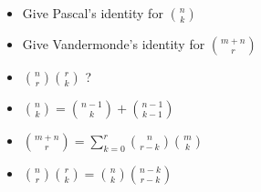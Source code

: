 \documentclass[12pt]{article}
\newcommand*{\xfield}[1]{\begin{mdframed}\centering #1\end{mdframed}\bigskip}
\newenvironment{note}{}{}
\begin{document}
\begin{note}
	\xfield{\begin{itemize}
	\item Give Pascal's identity for $\binom{n}{k}$
	\item Give Vandermonde's identity for $\binom{m+n}{r}$
	\item $\binom{n}{r}\binom{r}{k}$ ?
	\end{itemize} }
	\xfield{\begin{itemize}
	\item $\binom{n}{k} = \binom{n-1}{k} + \binom{n-1}{k-1}$
	\item  $\binom{m+n}{r} = \sum\limits^{r}_{k=0} \binom{n}{r-k}\binom{m}{k}$
	\item $\binom{n}{r}\binom{r}{k}=\binom{n}{k}\binom{n-k}{r-k}$
	\end{itemize} }
\end{note}
\end{document}
